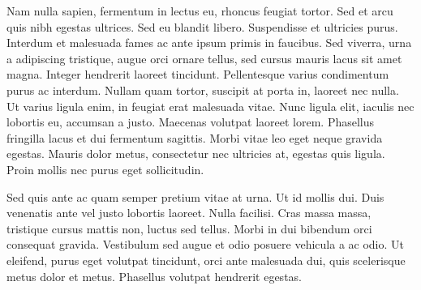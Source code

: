 Nam nulla sapien, fermentum in lectus eu, rhoncus feugiat tortor. Sed
et arcu quis nibh egestas ultrices. Sed eu blandit libero. Suspendisse
et ultricies purus. Interdum et malesuada fames ac ante ipsum primis
in faucibus. Sed viverra, urna a adipiscing tristique, augue orci
ornare tellus, sed cursus mauris lacus sit amet magna. Integer
hendrerit laoreet tincidunt. Pellentesque varius condimentum purus ac
interdum. Nullam quam tortor, suscipit at porta in, laoreet nec nulla.
Ut varius ligula enim, in feugiat erat malesuada vitae. Nunc ligula
elit, iaculis nec lobortis eu, accumsan a justo. Maecenas volutpat
laoreet lorem. Phasellus fringilla lacus et dui fermentum sagittis.
Morbi vitae leo eget neque gravida egestas. Mauris dolor metus,
consectetur nec ultricies at, egestas quis ligula. Proin mollis nec
purus eget sollicitudin.

Sed quis ante ac quam semper pretium vitae at urna. Ut id mollis dui.
Duis venenatis ante vel justo lobortis laoreet. Nulla facilisi. Cras
massa massa, tristique cursus mattis non, luctus sed tellus. Morbi in
dui bibendum orci consequat gravida. Vestibulum sed augue et odio
posuere vehicula a ac odio. Ut eleifend, purus eget volutpat
tincidunt, orci ante malesuada dui, quis scelerisque metus dolor et
metus. Phasellus volutpat hendrerit egestas.
